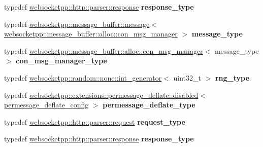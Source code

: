 \begin{DoxyCompactItemize}
typedef \mbox{\hyperlink{classwebsocketpp_1_1http_1_1parser_1_1response}{websocketpp\+::http\+::parser\+::response}} {\bfseries response\+\_\+type}
\item 
\mbox{\label{structstub__config_a251ee9935f06ff126dbdcae6af183493}} 
typedef \mbox{\hyperlink{classwebsocketpp_1_1message__buffer_1_1message}{websocketpp\+::message\+\_\+buffer\+::message}}$<$ \mbox{\hyperlink{classwebsocketpp_1_1message__buffer_1_1alloc_1_1con__msg__manager}{websocketpp\+::message\+\_\+buffer\+::alloc\+::con\+\_\+msg\+\_\+manager}} $>$ {\bfseries message\+\_\+type}
\item 
\mbox{\label{structstub__config_a590413e515623cd51f1cd6c0f72f1018}} 
typedef \mbox{\hyperlink{classwebsocketpp_1_1message__buffer_1_1alloc_1_1con__msg__manager}{websocketpp\+::message\+\_\+buffer\+::alloc\+::con\+\_\+msg\+\_\+manager}}$<$ message\+\_\+type $>$ {\bfseries con\+\_\+msg\+\_\+manager\+\_\+type}
\item 
\mbox{\label{structstub__config_aeea6c7fab96f8cc229d78a822ff9cc5d}} 
typedef \mbox{\hyperlink{classwebsocketpp_1_1random_1_1none_1_1int__generator}{websocketpp\+::random\+::none\+::int\+\_\+generator}}$<$ uint32\+\_\+t $>$ {\bfseries rng\+\_\+type}
\item 
\mbox{\label{structstub__config_a542a8c30b8eec0e129d9487b3a598bdb}} 
typedef \mbox{\hyperlink{classwebsocketpp_1_1extensions_1_1permessage__deflate_1_1disabled}{websocketpp\+::extensions\+::permessage\+\_\+deflate\+::disabled}}$<$ \mbox{\hyperlink{structstub__config_1_1permessage__deflate__config}{permessage\+\_\+deflate\+\_\+config}} $>$ {\bfseries permessage\+\_\+deflate\+\_\+type}
\item 
\mbox{\label{structstub__config_a7d7d444e1d7b2882bf22746be5c25f37}} 
typedef \mbox{\hyperlink{classwebsocketpp_1_1http_1_1parser_1_1request}{websocketpp\+::http\+::parser\+::request}} {\bfseries request\+\_\+type}
\item 
\mbox{\label{structstub__config_af1ff5c46d4fc72bce3b5fb9f6090f4d6}} 
typedef \mbox{\hyperlink{classwebsocketpp_1_1http_1_1parser_1_1response}{websocketpp\+::http\+::parser\+::response}} {\bfseries response\+\_\+type}
\item 

\end{DoxyCompactItemize}
